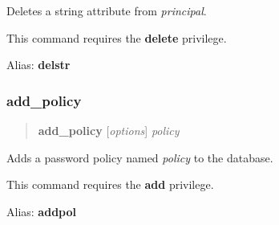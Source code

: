 \documentclass[letterpaper,10pt,english]{sphinxmanual}
\begin{document}
Deletes a string attribute from \emph{principal}.

This command requires the \textbf{delete} privilege.

Alias: \textbf{delstr}
\label{admin/admin_commands/kadmin_local:del-string-end}

\subsubsection{add\_policy}
\label{admin/admin_commands/kadmin_local:id12}\label{admin/admin_commands/kadmin_local:del-string-end}\label{admin/admin_commands/kadmin_local:add-policy}\begin{quote}

\textbf{add\_policy} {[}\emph{options}{]} \emph{policy}
\end{quote}

Adds a password policy named \emph{policy} to the database.

This command requires the \textbf{add} privilege.

Alias: \textbf{addpol}
\end{document}
